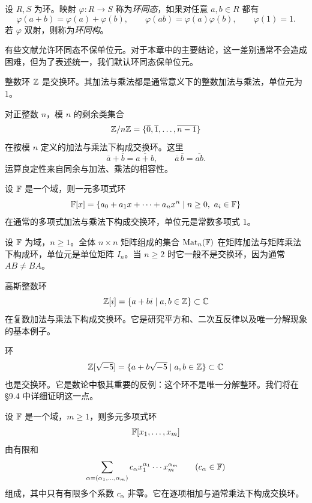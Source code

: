\begin{definition}
设 $R,S$ 为环。映射 $\varphi:R\to S$ 称为\emph{环同态}，如果对任意 $a,b\in R$ 都有
\[
\varphi(a+b)=\varphi(a)+\varphi(b),\qquad \varphi(ab)=\varphi(a)\varphi(b),\qquad \varphi(1)=1.
\]
若 $\varphi$ 双射，则称为\emph{环同构}。
\end{definition}

\begin{remark}
有些文献允许环同态不保单位元。对于本章中的主要结论，这一差别通常不会造成困难，但为了表述统一，我们默认环同态保单位元。
\end{remark}

\begin{example}
整数环 $\mathbb{Z}$ 是交换环。其加法与乘法都是通常意义下的整数加法与乘法，单位元为 $1$。
\end{example}

\begin{example}
对正整数 $n$，模 $n$ 的剩余类集合
\[
\mathbb{Z}/n\mathbb{Z}=\{\overline{0},\overline{1},\dots,\overline{n-1}\}
\]
在按模 $n$ 定义的加法与乘法下构成交换环。这里
\[
\overline{a}+\overline{b}=\overline{a+b},\qquad \overline{a}\,\overline{b}=\overline{ab}.
\]
运算良定性来自同余与加法、乘法的相容性。
\end{example}

\begin{example}
设 $\mathbb{F}$ 是一个域，则一元多项式环
\[
\mathbb{F}[x]=\left\{a_0+a_1x+\cdots+a_nx^n\mid n\ge 0,\ a_i\in\mathbb{F}\right\}
\]
在通常的多项式加法与乘法下构成交换环，单位元是常数多项式 $1$。
\end{example}

\begin{example}
设 $\mathbb{F}$ 为域，$n\ge 1$。全体 $n\times n$ 矩阵组成的集合 $\mathrm{Mat}_n(\mathbb{F})$ 在矩阵加法与矩阵乘法下构成环，单位元是单位矩阵 $I_n$。当 $n\ge 2$ 时它一般不是交换环，因为通常 $AB\neq BA$。
\end{example}

\begin{example}
高斯整数环
\[
\mathbb{Z}[i]=\{a+bi\mid a,b\in\mathbb{Z}\}\subset \mathbb{C}
\]
在复数加法与乘法下构成交换环。它是研究平方和、二次互反律以及唯一分解现象的基本例子。
\end{example}

\begin{example}
环
\[
\mathbb{Z}[\sqrt{-5}]=\{a+b\sqrt{-5}\mid a,b\in\mathbb{Z}\}\subset \mathbb{C}
\]
也是交换环。它是数论中极其重要的反例：这个环不是唯一分解整环。我们将在 \S9.4 中详细证明这一点。
\end{example}

\begin{example}
设 $\mathbb{F}$ 是一个域，$m\ge 1$，则多元多项式环
\[
\mathbb{F}[x_1,\dots,x_m]
\]
由有限和
\[
\sum_{\alpha=(\alpha_1,\dots,\alpha_m)} c_{\alpha}x_1^{\alpha_1}\cdots x_m^{\alpha_m}
\qquad (c_{\alpha}\in \mathbb{F})
\]
组成，其中只有有限多个系数 $c_{\alpha}$ 非零。它在逐项相加与通常乘法下构成交换环。
\end{example}

